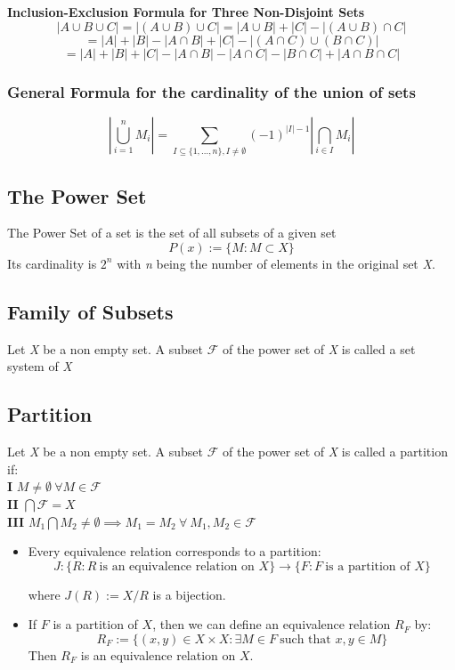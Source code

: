 \textbf{Inclusion-Exclusion Formula for Three Non-Disjoint Sets}
\[
	|A \cup B \cup C| = |(A \cup B) \cup C| = |A \cup B| + |C| - |(A \cup B) \cap C|
\]
\[
	= |A| + |B| - |A \cap B| + |C| - |(A \cap C) \cup (B \cap C)|
\]
\[
	= |A| + |B| + |C| - |A \cap B| - |A \cap C| - |B \cap C| + |A \cap B \cap C|
\]

\subsubsection{General Formula for the cardinality of the union of sets}

\[
	\left\vert \bigcup_{i = 1}^n M_i \right\vert  = \sum_{I \subseteq \{1, \dots, n\}, I \neq \emptyset}(-1)^{|I| - 1} \left\vert \bigcap_{i \in I} M_i \right\vert
\]

\subsection{The Power Set}
The Power Set of a set is the set of all subsets of a given set \[
	P(x):= \{ M: M \subset X\}
\]
Its cardinality is $2^n$ with \textit{n} being the number of elements in the original set \textit{X}.

\subsection{Family of Subsets}
Let \textit{X} be a non empty set. A subset $\mathscr{F}$ of the power set of \textit{X} is called a set system of \textit{X}

\subsection{Partition}
Let \textit{X} be a non empty set. A subset $\mathscr{F}$ of the power set of \textit{X} is called a partition if:\\
\textbf{I} $M \neq  \emptyset\ \forall M \in \mathscr{F}$\\
\textbf{II} $\bigcap \mathscr{F} = X$\\
\textbf{III} $M_1 \bigcap M_2 \ne \emptyset \implies M_1 = M_2\ \forall\ M_1, M_2 \in \mathscr{F} $

\begin{itemize}[label=$-$]

	\item Every equivalence relation corresponds to a partition:
	      \[
		      J: \{ R : R\ \text{is an equivalence relation on } X\} \to \{ F: F\ \text{is a partition of } X\}
	      \]

	      where \( J(R) := X / R \) is a bijection.

	\item If \( F \) is a partition of \( X \), then we can define an equivalence relation \( R_F \) by:
	      \[
		      R_F := \{ (x, y) \in X \times X : \exists M \in F\ \text{such that } x, y \in M \}
	      \]
	      Then \( R_F \) is an equivalence relation on \( X \).

\end{itemize}


